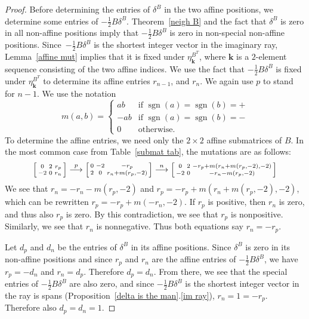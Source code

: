 \documentclass{amsart}
\theoremstyle{definition}
\theoremstyle{remark}
\numberwithin{equation}{section}
\newcommand{\sgn}{\operatorname{sgn}}
\newcommand{\0}{{\mathbf{0}}}
\newcommand{\kk}{{\boldsymbol{k}}}
\begin{document}
\begin{proof}
Before determining the entries of $\delta^B$ in the two affine positions, we determine some entries of $-\frac12B\delta^B$.
Theorem~\ref{neigh B} and the fact that $\delta^B$ is zero in all non-affine positions imply that $-\frac12B\delta^B$ is zero in non-special non-affine positions.
Since~$-\frac12B\delta^B$ is the shortest integer vector in the imaginary ray, Lemma~\ref{affine mut} implies that it is fixed under $\eta^{B^T}_\kk$, where $\kk$ is a $2$-element sequence consisting of the two affine indices. 
We use the fact that $-\frac12B\delta^B$ is fixed under $\eta^{B^T}_\kk$ to determine its affine entries $r_{n-1}$, and $r_n$.
We again use $p$ to stand for $n-1$.
We use the notation 
\[m(a,b)=\begin{cases}
ab&\text{if }\sgn(a)=\sgn(b)=+\\
-ab&\text{if }\sgn(a)=\sgn(b)=-\\
0&\text{otherwise}.
\end{cases}\]
To determine the affine entries, we need only the $2\times2$ affine submatrices of $B$.
In the most common case from Table~\ref{submat tab}, the mutations are as follows:
\[
\begin{bsmallmatrix*}
0 & 2 & r_p\\
-2 & 0 & r_n
\end{bsmallmatrix*}\overset{p}{\longrightarrow}
\begin{bsmallmatrix*}
0 & -2 & -r_p\\
2 & 0 & r_n+m(r_p,-2)
\end{bsmallmatrix*}\overset{n}{\longrightarrow}
\begin{bsmallmatrix*}
0 & 2 & -r_p+m(r_n+m(r_p,-2),-2)\\
-2 & 0 & -r_n-m(r_p,-2)
\end{bsmallmatrix*}
\]
We see that $r_n=-r_n-m(r_p,-2)$ and $r_p=-r_p+m(r_n+m(r_p,-2),-2)$, which can be rewritten $r_p=-r_p+m(-r_n,-2)$.
If $r_p$ is positive, then $r_n$ is zero, and thus also $r_p$ is zero.
By this contradiction, we see that $r_p$ is nonpositive.
Similarly, we see that $r_n$ is nonnegative.
Thus both equations say $r_n=-r_p$.

Let $d_p$ and $d_n$ be the entries of $\delta^B$ in its affine positions.
Since $\delta^B$ is zero in its non-affine positions and since $r_p$ and $r_n$ are the affine entries of $-\frac12B\delta^B$, we have $r_p=-d_n$ and $r_n=d_p$.
Therefore $d_p=d_n$.
From there, we see that the special entries of $-\frac12B\delta^B$ are also zero, and since $-\frac12B\delta^B$ is the shortest integer vector in the ray is spans (Proposition~\ref{delta is the man}.\ref{im ray}), $r_n=1=-r_p$.
Therefore also $d_p=d_n=1$.


\end{proof}
\end{document}
